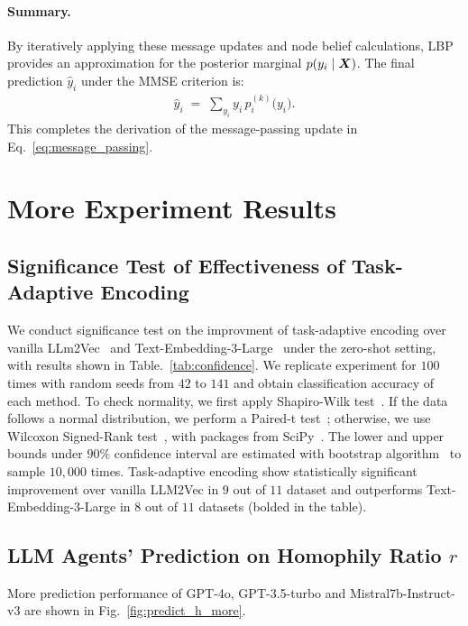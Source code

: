 \paragraph{Summary.}
By iteratively applying these message updates and node belief calculations, LBP provides an approximation for the posterior marginal \(p(y_i \mid \boldsymbol{X})\). The final prediction \(\hat{y}_i\) under the MMSE criterion is:
\begin{align}
    \hat{y}_i 
    \;=\; 
    \sum_{y_i} y_i \, p_i^{(k)}\bigl(y_i\bigr).
\end{align}
This completes the derivation of the message-passing update in Eq.~\eqref{eq:message_passing}.



\section{More Experiment Results}
\label{sec:app_more_experiment_results}


\subsection{Significance Test of Effectiveness of Task-Adaptive Encoding}


\label{sec:app_confidence}

We conduct significance test on the improvment of task-adaptive encoding over vanilla LLm2Vec~\cite{li2024making} and Text-Embedding-3-Large~\cite{openai2024textembedding} under the zero-shot setting, with results shown in Table.~\ref{tab:confidence}. We replicate experiment for $100$ times with random seeds from $42$ to $141$ and obtain classification accuracy of each method. To check normality, we first apply Shapiro-Wilk test~\cite{SHAPIRO1965}. If the data follows a normal distribution, we perform a Paired-t test~\cite{student1908probable}; otherwise, we use Wilcoxon Signed-Rank test~\cite{wilcoxon1992individual}, with packages from SciPy~\cite{2020SciPy-NMeth}.
The lower and upper bounds under $90\%$ confidence interval are estimated with bootstrap algorithm~\cite{tibshirani1993introduction} to sample $10,000$ times.
Task-adaptive encoding show statistically significant improvement over vanilla LLM2Vec in $9$ out of $11$ dataset and outperforms Text-Embedding-3-Large in $8$ out of $11$ datasets (bolded in the table).

\subsection{LLM Agents' Prediction on Homophily Ratio $r$}

More prediction performance of GPT-4o, GPT-3.5-turbo and Mistral7b-Instruct-v3 are shown in Fig.~\ref{fig:predict_h_more}.

